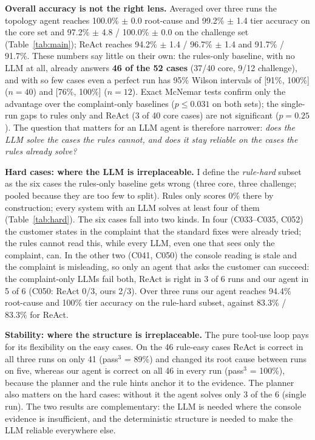 \documentclass[12pt,a4paper]{article}
\begin{document}
\textbf{Overall accuracy is not the right lens.} Averaged over three runs the topology agent reaches 100.0\%
$\pm$ 0.0 root-cause and 99.2\% $\pm$ 1.4 tier accuracy on the core set and 97.2\% $\pm$ 4.8 / 100.0\% $\pm$ 0.0 on the
challenge set (Table~\ref{tab:main}); ReAct reaches 94.2\% $\pm$ 1.4 / 96.7\% $\pm$ 1.4 and 91.7\% / 91.7\%. These
numbers say little on their own: the rules-only baseline, with no LLM at all, already answers \textbf{46 of the 52
cases} (37/40 core, 9/12 challenge), and with so few cases even a perfect run has 95\% Wilson intervals of
[91\%, 100\%] ($n=40$) and [76\%, 100\%] ($n=12$). Exact McNemar tests confirm only the advantage over the
complaint-only baselines ($p\le0.031$ on both sets); the single-run gaps to rules only and ReAct (3 of 40 core cases)
are not significant ($p=0.25$). The question that matters for an LLM agent is therefore narrower: \emph{does the LLM
solve the cases the rules cannot, and does it stay reliable on the cases the rules already solve?}

\textbf{Hard cases: where the LLM is irreplaceable.} I define the \emph{rule-hard} subset as the six cases the
rules-only baseline gets wrong (three core, three challenge; pooled because they are too few to split). Rules only
scores 0\% there by construction; every system with an LLM solves at least four of them (Table~\ref{tab:hard}). The
six cases fall into two kinds. In four (C033--C035, C052) the customer states in the complaint that the standard
fixes were already tried; the rules cannot read this, while every LLM, even one that sees only the complaint, can.
In the other two (C041, C050) the console reading is stale and the complaint is misleading, so only an agent that
asks the customer can succeed: the complaint-only LLMs fail both, ReAct is right in 3 of 6 runs and our agent in 5 of
6 (C050: ReAct 0/3, ours 2/3). Over three runs our agent reaches 94.4\% root-cause and 100\% tier accuracy on the
rule-hard subset, against 83.3\% / 83.3\% for ReAct.

\textbf{Stability: where the structure is irreplaceable.} The pure tool-use loop pays for its flexibility on the easy
cases. On the 46 rule-easy cases ReAct is correct in all three runs on only 41 (pass$^3$ = 89\%) and changed its root
cause between runs on five, whereas our agent is correct on all 46 in every run (pass$^3$ = 100\%), because the
planner and the rule hints anchor it to the evidence. The planner also matters on the hard cases: without it the agent
solves only 3 of the 6 (single run). The two results are complementary: the LLM is needed where the console evidence
is insufficient, and the deterministic structure is needed to make the LLM reliable everywhere else.
\end{document}

